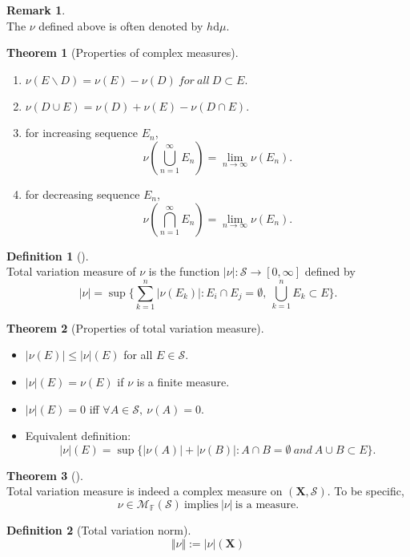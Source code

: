 \documentclass[12pt]{book}
\theoremstyle{definition}
\newtheorem{definition}{Definition}[chapter]
\newtheorem{theorem}{Theorem}[chapter]
\newtheorem{remark}{Remark}
\newcommand{\F}{\mathbb{F}}
\newcommand{\X}{\mathbf{X}}
\newcommand{\D}{\mathrm{d}}
\newcommand{\M}{\mathcal{M}}
\newcommand{\Sum}[2]{{\sum_{#1}^{#2}}}
\newcommand{\Union}[2]{{\bigcup_{#1}^{#2}}}
\newcommand{\Intersection}[2]{{\bigcap_{#1}^{#2}}}
\begin{document}
\begin{remark} \ \\
The $\nu$ defined above is often denoted by $h\D\mu$.
\end{remark}

\begin{theorem}[Properties of complex measures]\
\begin{enumerate}
	\item $\nu(E\backslash D) = \nu(E)-\nu(D) \ for \ all\  D \subset E.$
	\item $\nu(D \cup E) = \nu(D) + \nu(E) - \nu(D\cap E)$.
	\item for increasing sequence $E_n$,
	$$\nu(\Union{n=1}{\infty}E_n)=\lim_{n \to \infty}\nu(E_n). $$
	\item for decreasing sequence $E_n$,
	$$\nu(\Intersection{n=1}{\infty}E_n)=\lim_{n \to \infty}\nu(E_n). $$
\end{enumerate}
\end{theorem}

\begin{definition}[] \ \\
Total variation measure of $\nu$ is the function $|\nu|: \mathcal S \to [0,\infty]$ defined by
$$
|\nu| = \sup\{\Sum{k=1}{n}|\nu(E_k)|: E_i \cap E_j =\emptyset, \ \Union{k=1}{n}E_k \subset E\}.
$$
\end{definition}

\begin{theorem}[Properties of total variation measure] \ 
\begin{itemize}
	\item $|\nu(E)| \leq |\nu|(E)$ for all $E \in \mathcal S$.
	\item $|\nu|(E) = \nu(E)$ if $\nu$ is a finite measure.
	\item $|\nu|(E) = 0$ iff $\forall A\in \mathcal S, \ \nu(A)=0$.
	\item Equivalent definition: $$|\nu|(E)=\sup\{|\nu(A)|+|\nu(B)|: A\cap B=\emptyset \ and \ A \cup B \subset E \}.$$
\end{itemize}
\end{theorem}

\begin{theorem}[] \ \\
Total variation measure is indeed a complex measure on $(\X,\mathcal S)$. To be specific,
$$\nu \in \M_\F(\mathcal S) \ \text{implies} \ |\nu| \ \text{is a measure}.$$
\end{theorem}

\begin{definition}[Total variation norm] \ \\
$$
\Vert \nu \Vert := |\nu|(\X)
$$
\end{definition}
\end{document}
